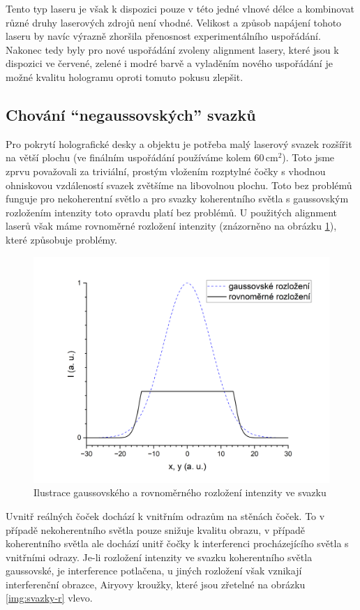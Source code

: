 \documentclass[twoside,project]{../MFFPrace}
\begin{document}
Tento typ laseru je však k dispozici pouze v této jedné vlnové délce a kombinovat různé druhy laserových zdrojů není vhodné. Velikost a způsob napájení tohoto laseru by navíc výrazně zhoršila přenosnost experimentálního uspořádání. Nakonec tedy byly pro nové uspořádání zvoleny alignment lasery, které jsou k dispozici ve červené, zelené i modré barvě a vyladěním nového uspořádání je možné kvalitu hologramu oproti tomuto pokusu zlepšit.

\subsection{Chování "`negaussovských"' svazků\label{sec:negauss}}
Pro pokrytí holografické desky a objektu je potřeba malý laserový svazek rozšířit na větší plochu (ve finálním uspořádání používáme kolem $60\,\text{cm}^2$). Toto jsme zprvu považovali za triviální, prostým vložením rozptylné čočky s vhodnou ohniskovou vzdáleností svazek zvětšíme na libovolnou plochu. Toto bez problémů funguje pro nekoherentní světlo a pro svazky koherentního světla s gaussovským rozložením intenzity toto opravdu platí bez problémů. U použitých alignment laserů však máme rovnoměrné rozložení intenzity (znázorněno na obrázku \ref{img:intenzity}), které způsobuje problémy.

\begin{figure}[!ht]
    \centering
    \includegraphics[width=0.6\linewidth]{../img/rozlozeni-intenzity.png}
    \caption{Ilustrace gaussovského a rovnoměrného rozložení intenzity ve svazku}
    \label{img:intenzity}
\end{figure}

Uvnitř reálných čoček dochází k vnitřním odrazům na stěnách čoček. To v případě nekoherentního světla pouze snižuje kvalitu obrazu, v případě koherentního světla ale dochází unitř čočky k interferenci procházejícího světla s vnitřními odrazy. Je-li rozložení intenzity ve svazku koherentního světla gaussovské, je interference potlačena, u jiných rozložení však vznikají interferenční obrazce, Airyovy kroužky, které jsou zřetelné na obrázku \ref{img:svazky-r} vlevo.
\end{document}
